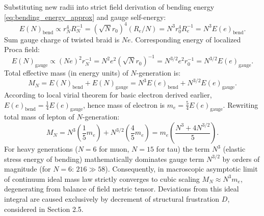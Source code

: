 \documentclass[12pt,a4paper]{article}
\begin{document}
Substituting new radii into strict field derivation of bending energy \eqref{eq:bending_energy_approx} and gauge self-energy:
\begin{equation}
    E(N)_{\text{bend}} \propto r_N^4 R_N^{-1} = (\sqrt{N}r_0)^4 (R_e/N) = N^3 r_0^4 R_e^{-1} = N^3 E(e)_{\text{bend}}.
    \label{eq:bending_scaling}
\end{equation}
Sum gauge charge of twisted braid is $Ne$. Corresponding energy of localized Proca field:
\begin{equation}
    E(N)_{\text{gauge}} \propto (Ne)^2 r_N^{-1} = N^2 e^2 (\sqrt{N}r_0)^{-1} = N^{3/2} e^2 r_0^{-1} = N^{3/2} E(e)_{\text{gauge}}.
    \label{eq:gauge_scaling}
\end{equation}
Total effective mass (in energy units) of $N$-generation is:
\begin{equation}
    M_N = E(N)_{\text{bend}} + E(N)_{\text{gauge}} = N^3 E(e)_{\text{bend}} + N^{3/2} E(e)_{\text{gauge}}.
    \label{eq:total_mass_n}
\end{equation}
According to local virial theorem for basic electron derived earlier, $E(e)_{\text{bend}} = \frac{1}{4}E(e)_{\text{gauge}}$, hence mass of electron is $m_e = \frac{5}{4}E(e)_{\text{gauge}}$. Rewriting total mass of lepton of $N$-generation:
\begin{equation}
    M_N = N^3 \left( \frac{1}{5} m_e \right) + N^{3/2} \left( \frac{4}{5} m_e \right) = m_e \left( \frac{N^3 + 4N^{3/2}}{5} \right).
    \label{eq:mass_formula_n}
\end{equation}
For heavy generations ($N=6$ for muon, $N=15$ for tau) the term $N^3$ (elastic stress energy of bending) mathematically dominates gauge term $N^{3/2}$ by orders of magnitude (for $N=6$: $216 \gg 58$). Consequently, in macroscopic asymptotic limit of continuum ideal mass law strictly converges to cubic scaling $M_N \approx N^3 m_e$, degenerating from balance of field metric tensor. Deviations from this ideal integral are caused exclusively by decrement of structural frustration $D$, considered in Section 2.5.
\end{document}
